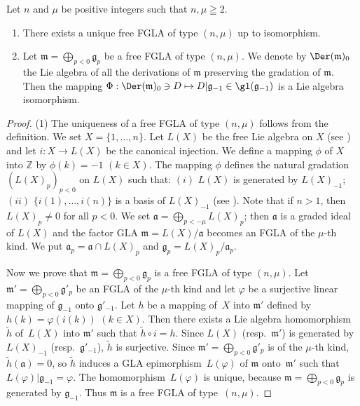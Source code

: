 \begin{proposition}\label{prop2.1} Let $n$ and $\mu$ be positive integers such that $n,\mu\geqq2$.
\begin{enumerate}\itemsep=0pt
\item There exists a unique free FGLA of type
$(n,\mu)$ up to isomorphism.
\item Let $\mathfrak m=\bigoplus\limits_{p<0}\mathfrak g_p$ be a free
FGLA of type $(n,\mu)$.
We denote by $\Der(\mathfrak m)_0$ the Lie algebra of all the derivations
of $\mathfrak m$ preserving the gradation of $\mathfrak m$.
Then the mapping $\Phi:\Der(\mathfrak m)_0\ni D\mapsto D|\mathfrak g_{-1}\in\gl(\mathfrak g_{-1})$ is a Lie algebra isomorphism.
\end{enumerate}
\end{proposition}
\begin{proof} (1)
The uniqueness of a free FGLA of type $(n,\mu)$ follows from the def\/inition.
We set $X=\{1,\dots,n\}$. Let $L(X)$ be the free Lie algebra on $X$
(see \cite[Chapter~II, \S~2]{bou72:1})
and let $i:X\to L(X)$ be the canonical injection.
We def\/ine a mapping $\phi$ of $X$ into $\mathbb Z$ by $\phi(k)=-1$ $(k\in X)$.
The mapping $\phi$ def\/ines the natural gradation $(L(X)_p)_{p<0}$
on $L(X)$ such that: $(i)$ $L(X)$ is generated by $L(X)_{-1}$;
$(ii)$ $\{i(1),\dots,i(n)\}$ is a basis of $L(X)_{-1}$
(see \cite[Chapter~II, \S~2, no.~6]{bou72:1}). Note that if $n>1$, then
$L(X)_p\ne0$ for all $p<0$.
We set $\mathfrak a=\bigoplus\limits_{p<-\mu}L(X)_p$;
then $\mathfrak a$ is a graded ideal of $L(X)$ and the factor GLA $\mathfrak m=L(X)/\mathfrak a$ becomes an FGLA of the $\mu$-th kind.
We put $\mathfrak a_p=\mathfrak a\cap L(X)_p$ and
$\mathfrak g_p=L(X)_p/\mathfrak a_p$.

Now we prove that $\mathfrak m=\bigoplus\limits_{p<0}\mathfrak g_p$ is a free
FGLA of type $(n,\mu)$.
Let $\mathfrak m'=\bigoplus\limits_{p<0}\mathfrak g'_p$ be an FGLA of the
$\mu$-th kind and let
$\varphi$ be a surjective linear mapping of $\mathfrak g_{-1}$ onto
$\mathfrak g'_{-1}$.
Let $h$ be a mapping of~$X$ into $\mathfrak m'$ def\/ined by $h(k)=\varphi(i(k))$ $(k\in X)$.
Then there exists a Lie algebra homomorphism~$\tilde{h}$ of~$L(X)$
into $\mathfrak m'$ such that $\tilde{h}\circ i=h$.
Since $L(X)$ (resp.~$\mathfrak m'$) is generated by
$L(X)_{-1}$ (resp.~$\mathfrak g'_{-1}$), $\tilde{h}$ is surjective.
Since $\mathfrak m'=\bigoplus\limits_{p<0}\mathfrak g'_p$ is of the
$\mu$-th kind, $\tilde{h}(\mathfrak a)=0$, so
$\tilde{h}$ induces a GLA epimorphism~$L(\varphi)$ of
$\mathfrak m$ onto~$\mathfrak m'$ such that
$L(\varphi)|\mathfrak g_{-1}=\varphi$.
The homomorphism~$L(\varphi)$ is unique, because
$\mathfrak m=\bigoplus\limits_{p<0}\mathfrak g_p$ is generated by
$\mathfrak g_{-1}$.
Thus $\mathfrak m$ is a free FGLA of type~$(n,\mu)$.


\end{proof}

